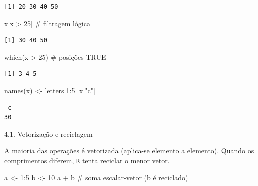 \documentclass[
  letterpaper,
  DIV=11,
  numbers=noendperiod]{scrreprt}
\newenvironment{Shaded}{\begin{snugshade}}{\end{snugshade}}
\newcommand{\CommentTok}[1]{\textcolor[rgb]{0.37,0.37,0.37}{#1}}
\newcommand{\DecValTok}[1]{\textcolor[rgb]{0.68,0.00,0.00}{#1}}
\newcommand{\FunctionTok}[1]{\textcolor[rgb]{0.28,0.35,0.67}{#1}}
\newcommand{\NormalTok}[1]{\textcolor[rgb]{0.00,0.23,0.31}{#1}}
\newcommand{\OtherTok}[1]{\textcolor[rgb]{0.00,0.23,0.31}{#1}}
\newcommand{\SpecialCharTok}[1]{\textcolor[rgb]{0.37,0.37,0.37}{#1}}
\newcommand{\StringTok}[1]{\textcolor[rgb]{0.13,0.47,0.30}{#1}}
\begin{document}
\begin{verbatim}
[1] 20 30 40 50
\end{verbatim}

\begin{Shaded}
\begin{Highlighting}[]
\NormalTok{x[x }\SpecialCharTok{\textgreater{}} \DecValTok{25}\NormalTok{]        }\CommentTok{\# filtragem lógica}
\end{Highlighting}
\end{Shaded}

\begin{verbatim}
[1] 30 40 50
\end{verbatim}

\begin{Shaded}
\begin{Highlighting}[]
\FunctionTok{which}\NormalTok{(x }\SpecialCharTok{\textgreater{}} \DecValTok{25}\NormalTok{)    }\CommentTok{\# posições TRUE}
\end{Highlighting}
\end{Shaded}

\begin{verbatim}
[1] 3 4 5
\end{verbatim}

\begin{Shaded}
\begin{Highlighting}[]
\FunctionTok{names}\NormalTok{(x) }\OtherTok{\textless{}{-}}\NormalTok{ letters[}\DecValTok{1}\SpecialCharTok{:}\DecValTok{5}\NormalTok{]}
\NormalTok{x[}\StringTok{"c"}\NormalTok{]}
\end{Highlighting}
\end{Shaded}

\begin{verbatim}
 c 
30 
\end{verbatim}

4.1. Vetorização e reciclagem

A maioria das operações é vetorizada (aplica-se elemento a elemento).
Quando os comprimentos diferem, \texttt{R} tenta reciclar o menor vetor.

\begin{Shaded}
\begin{Highlighting}[]
\NormalTok{a }\OtherTok{\textless{}{-}} \DecValTok{1}\SpecialCharTok{:}\DecValTok{5}
\NormalTok{b }\OtherTok{\textless{}{-}} \DecValTok{10}
\NormalTok{a }\SpecialCharTok{+}\NormalTok{ b   }\CommentTok{\# soma escalar{-}vetor (b é reciclado)}
\end{Highlighting}
\end{Shaded}
\end{document}
